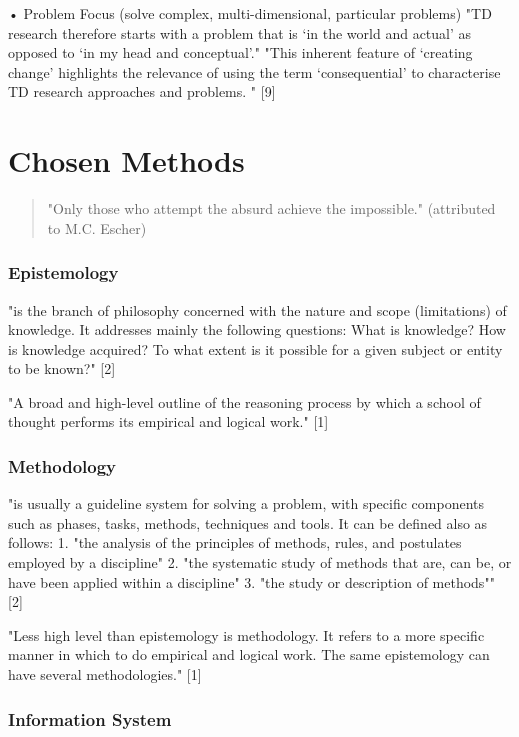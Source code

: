 •	Problem Focus
(solve complex, multi-dimensional, particular problems)
"TD research therefore starts with a problem that is ‘in the world and actual’ as opposed to ‘in my head and conceptual’." "This inherent feature of ‘creating change’ highlights the relevance of using the term ‘consequential’ to characterise TD research approaches and problems. " [9]

\section{Chosen Methods}

\begin{quote}
  "Only those who attempt the absurd achieve the impossible." (attributed to M.C. Escher)
\end{quote}

\subsubsection{Epistemology}

"is the branch of philosophy concerned with the nature and scope (limitations) of knowledge. It addresses mainly the following questions:
What is knowledge? How is knowledge acquired? To what extent is it possible for a given subject or entity to be known?" [2]

"A broad and high-level outline of the reasoning process by which a school of thought performs its empirical and logical work." [1]

\subsubsection{Methodology}

"is usually a guideline system for solving a problem, with specific components such as phases, tasks, methods, techniques and tools. It can be defined also as follows:
1.	"the analysis of the principles of methods, rules, and postulates employed by a discipline"
2.	"the systematic study of methods that are, can be, or have been applied within a discipline"
3.	"the study or description of methods"" [2]

"Less high level than epistemology is methodology. It refers to a more specific manner in which to do empirical and logical work. The same epistemology can have several methodologies." [1]

\subsubsection{Information System}

